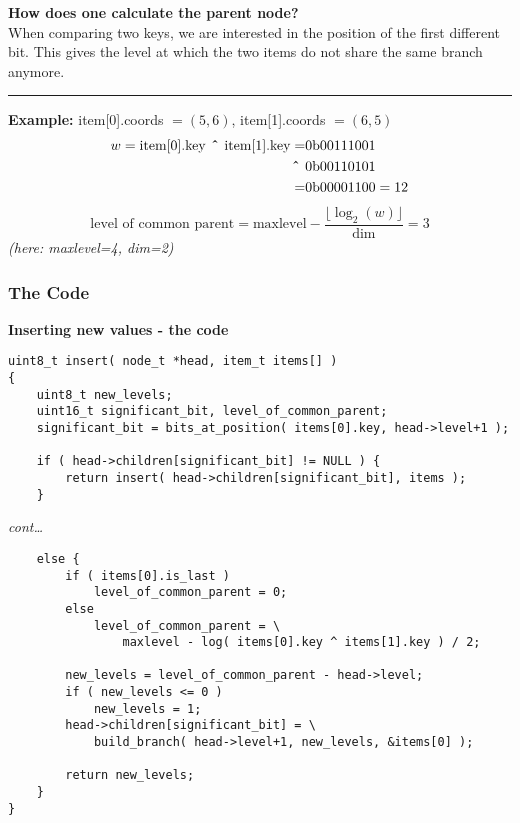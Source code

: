 \begin{frame}
    \textbf{How does one calculate the parent node?} \\
    When comparing two keys, we are interested in the position of the first
    different bit. This gives the level at which the two items do not share
    the same branch anymore.

    \noindent\rule{\textwidth}{1pt}

    \textbf{Example:} item[0].coords $= (5, 6)$, item[1].coords $= (6, 5)$ \\
    \begin{align}
        \begin{split}
            w = \textrm{item[0].key} \textrm{\textbf{ \^{} }} \textrm{item[1].key} =& 0\textrm{b}00111001 \\
            \textrm{\textbf{ \^{} }}& 0\textrm{b}00110101 \\
            =& 0\textrm{b}00001100 = 12
        \end{split}
    \end{align}
    \begin{equation}
        \textrm{level of common parent} =
        \textrm{maxlevel}-\frac{\lfloor \log_2\left(w\right)
        \rfloor}{\textrm{dim}} = 3
    \end{equation}
    {\small\textit{(here: maxlevel=4, dim=2)}}
\end{frame}

\subsubsection*{The Code}
\begin{frame}[fragile]
    \textbf{Inserting new values - the code}
    \begin{verbatim}
uint8_t insert( node_t *head, item_t items[] )
{
    uint8_t new_levels;
    uint16_t significant_bit, level_of_common_parent;
    significant_bit = bits_at_position( items[0].key, head->level+1 );

    if ( head->children[significant_bit] != NULL ) {
        return insert( head->children[significant_bit], items );
    }
    \end{verbatim}
\end{frame}

\begin{frame}[fragile]
    \textit{cont\dots}
    \begin{verbatim}
    else {
        if ( items[0].is_last )
            level_of_common_parent = 0;
        else
            level_of_common_parent = \
                maxlevel - log( items[0].key ^ items[1].key ) / 2;

        new_levels = level_of_common_parent - head->level;
        if ( new_levels <= 0 )
            new_levels = 1;
        head->children[significant_bit] = \
            build_branch( head->level+1, new_levels, &items[0] );

        return new_levels;
    }
}
    \end{verbatim}
\end{frame}

